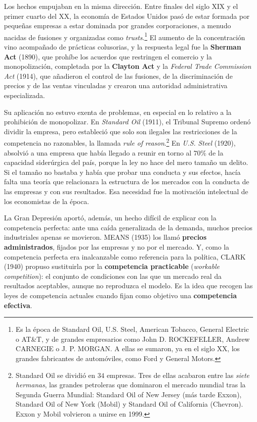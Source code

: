 \documentclass[10pt,a4paper]{article}
\begin{document}
Los hechos empujaban en la misma dirección. Entre finales del siglo XIX y el primer cuarto del XX, la economía de Estados Unidos pasó de estar formada por pequeñas empresas a estar dominada por grandes corporaciones, a menudo nacidas de fusiones y organizadas como \textit{trusts}.\footnote{%
    Es la época de Standard Oil, U.S. Steel, American Tobacco, General Electric o AT\&T, y de grandes empresarios como John D. ROCKEFELLER, Andrew CARNEGIE o J. P. MORGAN. A ellas se sumaron, ya en el siglo XX, los grandes fabricantes de automóviles, como Ford y General Motors.
} El aumento de la concentración vino acompañado de prácticas colusorias, y la respuesta legal fue la \textbf{Sherman Act} (1890), que prohíbe los acuerdos que restringen el comercio y la monopolización, completada por la \textbf{Clayton Act} y la \textit{Federal Trade Commission Act} (1914), que añadieron el control de las fusiones, de la discriminación de precios y de las ventas vinculadas y crearon una autoridad administrativa especializada.

Su aplicación no estuvo exenta de problemas, en especial en lo relativo a la prohibición de monopolizar. En \textit{Standard Oil} (1911), el Tribunal Supremo ordenó dividir la empresa, pero estableció que solo son ilegales las restricciones de la competencia no razonables, la llamada \textit{rule of reason}.\footnote{%
    Standard Oil se dividió en $34$ empresas. Tres de ellas acabaron entre las \textit{siete hermanas}, las grandes petroleras que dominaron el mercado mundial tras la Segunda Guerra Mundial: Standard Oil of New Jersey (más tarde Exxon), Standard Oil of New York (Mobil) y Standard Oil of California (Chevron). Exxon y Mobil volvieron a unirse en 1999.
} En \textit{U.S. Steel} (1920), absolvió a una empresa que había llegado a reunir en torno al $70\%$ de la capacidad siderúrgica del país, porque la ley no hace del mero tamaño un delito. Si el tamaño no bastaba y había que probar una conducta y sus efectos, hacía falta una teoría que relacionara la estructura de los mercados con la conducta de las empresas y con sus resultados. Esa necesidad fue la motivación intelectual de los economistas de la época.

La Gran Depresión aportó, además, un hecho difícil de explicar con la competencia perfecta: ante una caída generalizada de la demanda, muchos precios industriales apenas se movieron. MEANS (1935) los llamó \textbf{precios administrados}, fijados por las empresas y no por el mercado. Y, como la competencia perfecta era inalcanzable como referencia para la política, CLARK (1940) propuso sustituirla por la \textbf{competencia practicable} (\textit{workable competition}): el conjunto de condiciones con las que un mercado real da resultados aceptables, aunque no reproduzca el modelo. Es la idea que recogen las leyes de competencia actuales cuando fijan como objetivo una \textbf{competencia efectiva}.
\end{document}

